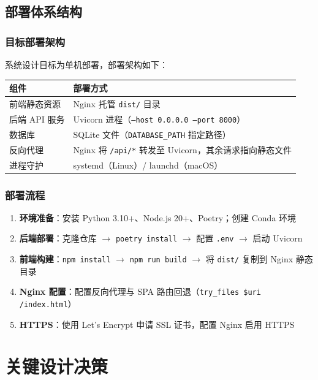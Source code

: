 \documentclass[11pt]{article}
\begin{document}
\subsection{部署体系结构}

\subsubsection{目标部署架构}

系统设计目标为单机部署，部署架构如下：

\begin{center}
\begin{tabular}{|l|l|}
\hline
\textbf{组件} & \textbf{部署方式} \\
\hline
前端静态资源 & Nginx 托管 \texttt{dist/} 目录 \\
后端 API 服务 & Uvicorn 进程（\texttt{--host 0.0.0.0 --port 8000}） \\
数据库 & SQLite 文件（\texttt{DATABASE\_PATH} 指定路径） \\
反向代理 & Nginx 将 \texttt{/api/*} 转发至 Uvicorn，其余请求指向静态文件 \\
进程守护 & systemd（Linux）/ launchd（macOS） \\
\hline
\end{tabular}
\end{center}

\subsubsection{部署流程}

\begin{enumerate}
    \item \textbf{环境准备}：安装 Python 3.10+、Node.js 20+、Poetry；创建 Conda 环境
    \item \textbf{后端部署}：克隆仓库 $\rightarrow$ \texttt{poetry install} $\rightarrow$ 配置 \texttt{.env} $\rightarrow$ 启动 Uvicorn
    \item \textbf{前端构建}：\texttt{npm install} $\rightarrow$ \texttt{npm run build} $\rightarrow$ 将 \texttt{dist/} 复制到 Nginx 静态目录
    \item \textbf{Nginx 配置}：配置反向代理与 SPA 路由回退（\texttt{try\_files \$uri /index.html}）
    \item \textbf{HTTPS}：使用 Let's Encrypt 申请 SSL 证书，配置 Nginx 启用 HTTPS
\end{enumerate}

\section{关键设计决策}
\end{document}
